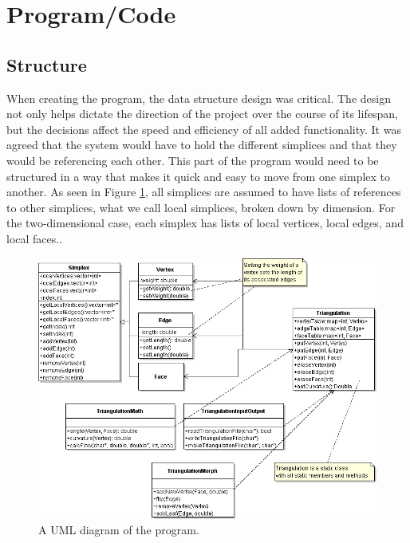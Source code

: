 \documentclass[12pt]{article}
\begin{document}
\section{Program/Code}
\subsection{Structure}

When creating the program, the data structure design was critical. The design not only helps dictate the direction of the project over the course of its lifespan, but the decisions affect the speed and efficiency of all added functionality. It was agreed that the system would have to hold the different simplices and that they would be referencing each other. This part of the program would need to be structured in a way that makes it quick and easy to move from one simplex to another. As seen in Figure \ref{triUML}, all simplices are assumed to have lists of references to other simplices, what we call local simplices, broken down by dimension. For the two-dimensional case, each simplex has lists of local vertices, local edges, and local faces..\newline


\begin{figure}
\begin{center}
\includegraphics[scale = 0.45]{triangulationUML.png}
\end{center}
\caption{A UML diagram of the program.}
\label{triUML}
\end{figure}
  
\end{document}

